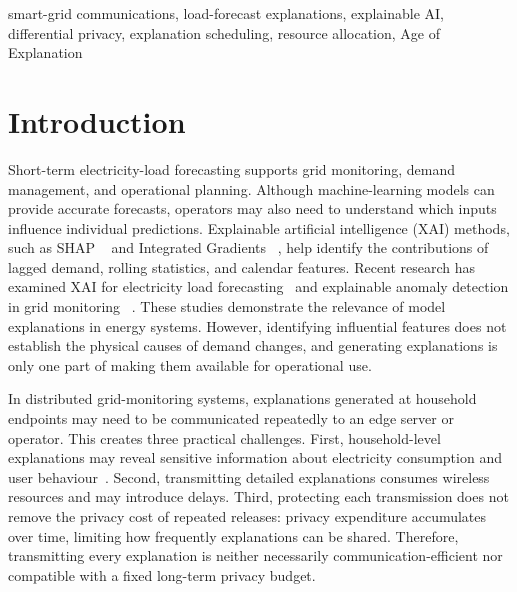 \documentclass[conference]{IEEEtran}
\begin{document}
\begin{IEEEkeywords}
smart-grid communications, load-forecast explanations, explainable AI,
differential privacy, explanation scheduling, resource allocation,
Age of Explanation
\end{IEEEkeywords}



\section{Introduction}
\label{sec:introduction}

Short-term electricity-load forecasting supports grid
monitoring, demand management, and operational planning.
Although machine-learning models can provide accurate
forecasts, operators may also need to understand which
inputs influence individual predictions. Explainable
artificial intelligence (XAI) methods, such as SHAP
~\cite{lundberg2017shap} and Integrated Gradients
~\cite{sundararajan2017ig}, help identify the contributions
of lagged demand, rolling statistics, and calendar
features. Recent research has examined XAI for electricity
load forecasting~\cite{baur2024loadxai} and explainable
anomaly detection in grid monitoring
~\cite{gebhard2025anomaly}. These studies demonstrate
the relevance of model explanations in energy systems.
However, identifying influential features does not
establish the physical causes of demand changes, and
generating explanations is only one part of making
them available for operational use.

In distributed grid-monitoring systems, explanations
generated at household endpoints may need to be
communicated repeatedly to an edge server or operator.
This creates three practical challenges. First,
household-level explanations may reveal sensitive
information about electricity consumption and user
behaviour~\cite{shokri2021privacy}. Second, transmitting
detailed explanations consumes wireless resources and
may introduce delays. Third, protecting each
transmission does not remove the privacy cost of
repeated releases: privacy expenditure accumulates
over time, limiting how frequently explanations can
be shared. Therefore, transmitting every explanation
is neither necessarily communication-efficient nor
compatible with a fixed long-term privacy budget.
\end{document}

